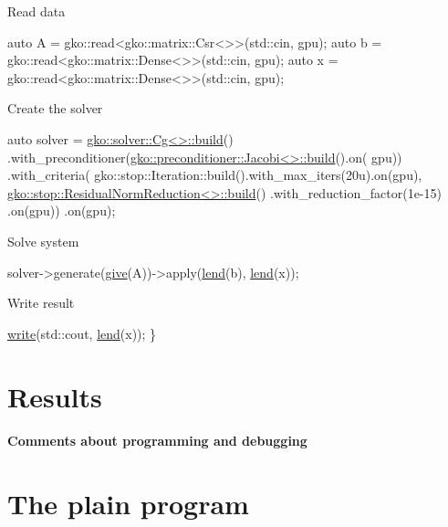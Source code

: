 Read data


\begin{DoxyCode}
\textcolor{keyword}{auto} A = gko::read<gko::matrix::Csr<>>(std::cin, gpu);
\textcolor{keyword}{auto} b = gko::read<gko::matrix::Dense<>>(std::cin, gpu);
\textcolor{keyword}{auto} x = gko::read<gko::matrix::Dense<>>(std::cin, gpu);
\end{DoxyCode}


Create the solver


\begin{DoxyCode}
\textcolor{keyword}{auto} solver =
    \hyperlink{classgko_1_1solver_1_1Cg}{gko::solver::Cg<>::build}()
        .with\_preconditioner(\hyperlink{classgko_1_1preconditioner_1_1Jacobi}{gko::preconditioner::Jacobi<>::build}().on(
      gpu))
        .with\_criteria(
            gko::stop::Iteration::build().with\_max\_iters(20u).on(gpu),
            \hyperlink{classgko_1_1stop_1_1ResidualNormReduction}{gko::stop::ResidualNormReduction<>::build}()
                .with\_reduction\_factor(1e-15)
                .on(gpu))
        .on(gpu);
\end{DoxyCode}


Solve system


\begin{DoxyCode}
solver->generate(\hyperlink{namespacegko_acbd3fd6d07e498892881e8e2ab0b4167}{give}(A))->apply(\hyperlink{namespacegko_aa8cb4876b72e5e1036ea9575443c439b}{lend}(b), \hyperlink{namespacegko_aa8cb4876b72e5e1036ea9575443c439b}{lend}(x));
\end{DoxyCode}


Write result


\begin{DoxyCode}
    \hyperlink{namespacegko_a859dc47a462721d83728d91ab7fa2148}{write}(std::cout, \hyperlink{namespacegko_aa8cb4876b72e5e1036ea9575443c439b}{lend}(x));
\}
\end{DoxyCode}
 \label{_Results}%
\section*{Results}

\label{_Commentsaboutprogramminganddebugging}%
\paragraph*{Comments about programming and debugging }

\label{_PlainProg}%
 \section*{The plain program}



